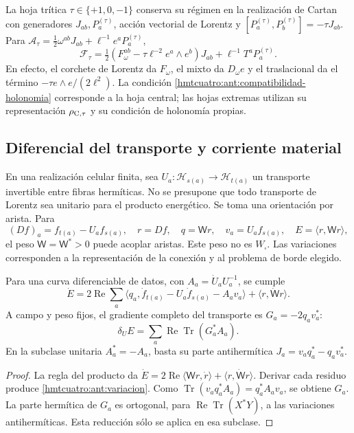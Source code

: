 La hoja trítica \(\tau\in\{+1,0,-1\}\) conserva su régimen en la
realización de Cartan con generadores \(J_{ab},P_a^{(\tau)}\),
acción vectorial de Lorentz y
\([P_a^{(\tau)},P_b^{(\tau)}]=-\tau J_{ab}\). Para
\(\mathcal A_\tau=\frac12\omega^{ab}J_{ab}+\ell^{-1}e^aP_a^{(\tau)}\),
\[
 \mathcal F_\tau=
 \tfrac12(F_\omega^{ab}-\tau\ell^{-2}e^a\wedge e^b)J_{ab}
 +\ell^{-1}T^aP_a^{(\tau)} .
\]
En efecto, el corchete de Lorentz da \(F_\omega\), el mixto
da \(D_\omega e\) y el traslacional da el término
\(-\tau e\wedge e/(2\ell^2)\). La condición
\eqref{hmtcuatro:ant:compatibilidad-holonomia} corresponde a la
hoja central; las hojas extremas utilizan su representación
\(\rho_{{\rm C},\tau}\) y su condición de holonomía propias.

\subsection{Diferencial del transporte y corriente material}
\label{hmtcuatro:ant:corriente-transporte}

En una realización celular finita, sea
\(U_a:\mathcal H_{s(a)}\to\mathcal H_{t(a)}\) un transporte
invertible entre fibras hermíticas. No se presupone que todo
transporte de Lorentz sea unitario para el producto energético.
Se toma una orientación por arista. Para
\[
 (Df)_a=f_{t(a)}-U_af_{s(a)},\quad r=Df,\quad
 q=\mathsf W r,\quad v_a=U_af_{s(a)},\quad
 E=\langle r,\mathsf W r\rangle ,
\]
el peso \(\mathsf W=\mathsf W^*>0\) puede acoplar aristas.
Este peso no es \(W_\square\). Las variaciones corresponden a
la representación de la conexión y al problema de borde elegido.

\begin{proposition}
\label{hmtcuatro:ant:variacion-completa}
Para una curva diferenciable de datos, con
\(A_a=\dot U_aU_a^{-1}\), se cumple
\begin{equation}
 \dot E=2\operatorname{Re}\sum_a
 \langle q_a,\dot f_{t(a)}-U_a\dot f_{s(a)}-A_av_a\rangle
 +\langle r,\dot{\mathsf W}r\rangle .
 \label{hmtcuatro:ant:variacion}
\end{equation}
A campo y peso fijos, el gradiente completo del transporte es
\(G_a=-2q_av_a^*\):
\[
 \delta_U E=\sum_a\operatorname{Re}\operatorname{Tr}(G_a^*A_a).
\]
En la subclase unitaria \(A_a^*=-A_a\), basta su parte
antihermítica \(J_a=v_aq_a^*-q_av_a^*\).
\end{proposition}
\begin{proof}
La regla del producto da
\(\dot E=2\operatorname{Re}\langle\mathsf W r,\dot r\rangle+
\langle r,\dot{\mathsf W}r\rangle\).
Derivar cada residuo produce \eqref{hmtcuatro:ant:variacion}.
Como \(\operatorname{Tr}(v_aq_a^*A_a)=q_a^*A_av_a\), se obtiene
\(G_a\). La parte hermítica de \(G_a\) es ortogonal, para
\(\operatorname{Re}\operatorname{Tr}(X^*Y)\), a las variaciones
antihermíticas. Esta reducción sólo se aplica en esa subclase.
\end{proof}


